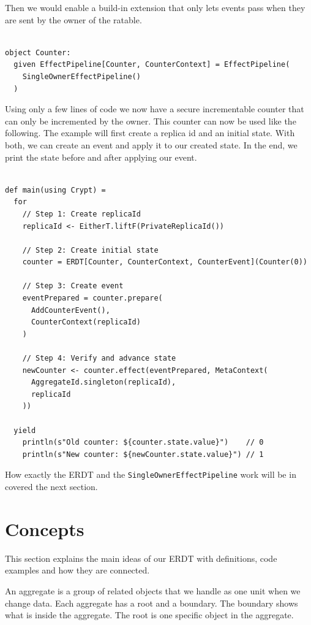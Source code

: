 \documentclass[
	english,
	ruledheaders=section,   %
	class=report,		    %
	thesis={type=bachelor}, %
	accentcolor=9c,			%
	custommargins=true,    %
	marginpar=false,        %
	parskip=half-,          %
	fontsize=11pt,          %
]{tudapub}
\begin{document}
Then we would enable a build-in extension that only lets events pass when they are sent by the owner of the ratable.

\begin{lstlisting}

object Counter:
  given EffectPipeline[Counter, CounterContext] = EffectPipeline(
    SingleOwnerEffectPipeline()
  )

\end{lstlisting}

Using only a few lines of code we now have a secure incrementable counter that can only be incremented by the owner. This counter can now be used like the following. The example will first create a replica id and an initial state. With both, we can create an event and apply it to our created state. In the end, we print the state before and after applying our event. 

\begin{lstlisting}
    
def main(using Crypt) = 
  for
    // Step 1: Create replicaId
    replicaId <- EitherT.liftF(PrivateReplicaId())

    // Step 2: Create initial state
    counter = ERDT[Counter, CounterContext, CounterEvent](Counter(0))

    // Step 3: Create event
    eventPrepared = counter.prepare(
      AddCounterEvent(),
      CounterContext(replicaId)
    )

    // Step 4: Verify and advance state
    newCounter <- counter.effect(eventPrepared, MetaContext(
      AggregateId.singleton(replicaId), 
      replicaId
    ))

  yield
    println(s"Old counter: ${counter.state.value}")    // 0
    println(s"New counter: ${newCounter.state.value}") // 1

\end{lstlisting}

How exactly the ERDT and the \texttt{SingleOwnerEffectPipeline} work will be in covered the next section.

\section{Concepts}

This section explains the main ideas of our ERDT with definitions, code examples and how they are connected.


An aggregate is a group of related objects that we handle as one unit when we change data. Each aggregate has a root and a boundary. The boundary shows what is inside the aggregate. The root is one specific object in the aggregate. 
\end{document}
